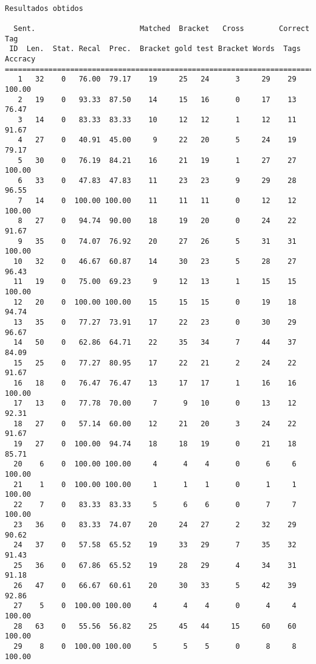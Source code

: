 \begin{verbatim}

Resultados obtidos

  Sent.                        Matched  Bracket   Cross        Correct Tag
 ID  Len.  Stat. Recal  Prec.  Bracket gold test Bracket Words  Tags Accracy
============================================================================
   1   32    0   76.00  79.17    19     25   24      3     29    29   100.00
   2   19    0   93.33  87.50    14     15   16      0     17    13    76.47
   3   14    0   83.33  83.33    10     12   12      1     12    11    91.67
   4   27    0   40.91  45.00     9     22   20      5     24    19    79.17
   5   30    0   76.19  84.21    16     21   19      1     27    27   100.00
   6   33    0   47.83  47.83    11     23   23      9     29    28    96.55
   7   14    0  100.00 100.00    11     11   11      0     12    12   100.00
   8   27    0   94.74  90.00    18     19   20      0     24    22    91.67
   9   35    0   74.07  76.92    20     27   26      5     31    31   100.00
  10   32    0   46.67  60.87    14     30   23      5     28    27    96.43
  11   19    0   75.00  69.23     9     12   13      1     15    15   100.00
  12   20    0  100.00 100.00    15     15   15      0     19    18    94.74
  13   35    0   77.27  73.91    17     22   23      0     30    29    96.67
  14   50    0   62.86  64.71    22     35   34      7     44    37    84.09
  15   25    0   77.27  80.95    17     22   21      2     24    22    91.67
  16   18    0   76.47  76.47    13     17   17      1     16    16   100.00
  17   13    0   77.78  70.00     7      9   10      0     13    12    92.31
  18   27    0   57.14  60.00    12     21   20      3     24    22    91.67
  19   27    0  100.00  94.74    18     18   19      0     21    18    85.71
  20    6    0  100.00 100.00     4      4    4      0      6     6   100.00
  21    1    0  100.00 100.00     1      1    1      0      1     1   100.00
  22    7    0   83.33  83.33     5      6    6      0      7     7   100.00
  23   36    0   83.33  74.07    20     24   27      2     32    29    90.62
  24   37    0   57.58  65.52    19     33   29      7     35    32    91.43
  25   36    0   67.86  65.52    19     28   29      4     34    31    91.18
  26   47    0   66.67  60.61    20     30   33      5     42    39    92.86
  27    5    0  100.00 100.00     4      4    4      0      4     4   100.00
  28   63    0   55.56  56.82    25     45   44     15     60    60   100.00
  29    8    0  100.00 100.00     5      5    5      0      8     8   100.00

\end{verbatim}

